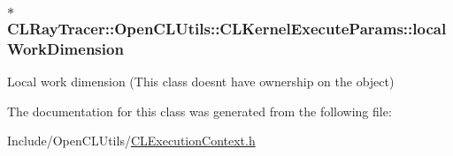 \subsubsection[{\texorpdfstring{local\+Work\+Dimension}{localWorkDimension}}]{$\ast$ C\+L\+Ray\+Tracer\+::\+Open\+C\+L\+Utils\+::\+C\+L\+Kernel\+Execute\+Params\+::local\+Work\+Dimension}\hypertarget{class_c_l_ray_tracer_1_1_open_c_l_utils_1_1_c_l_kernel_execute_params_ae0daedd4a1726c9ffa43b38f8e6c9920}{}\label{class_c_l_ray_tracer_1_1_open_c_l_utils_1_1_c_l_kernel_execute_params_ae0daedd4a1726c9ffa43b38f8e6c9920}
Local work dimension (This class doesn\textquotesingle{}t have ownership on the object) 

The documentation for this class was generated from the following file\+:\begin{DoxyCompactItemize}
\item 
Include/\+Open\+C\+L\+Utils/\hyperlink{_c_l_execution_context_8h}{C\+L\+Execution\+Context.\+h}\end{DoxyCompactItemize}
